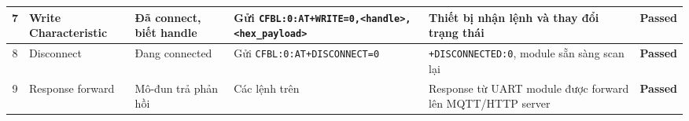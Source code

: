 \begin{longtable}{|c|p{2cm}|p{2.5cm}|p{3.5cm}|p{4cm}|c|}
            7 & Write Characteristic & Đã connect, biết handle & Gửi \texttt{CFBL:0:}\newline\texttt{AT+WRITE=0,}\newline\texttt{<handle>,}\newline\texttt{<hex\_payload>} & Thiết bị nhận lệnh và thay đổi trạng thái & \textcolor{modern_blue}{\textbf{Passed}} \\ \hline
            8 & Disconnect & Đang connected & Gửi \texttt{CFBL:0:}\newline\texttt{AT+DISCONNECT=0} & \texttt{+DISCONNECTED:0}, module sẵn sàng scan lại & \textcolor{modern_blue}{\textbf{Passed}} \\ \hline
            9 & Response forward & Mô-đun trả phản hồi & Các lệnh trên & Response từ UART module được forward lên MQTT/HTTP server & \textcolor{modern_blue}{\textbf{Passed}} \\ \hline
        \end{longtable}


